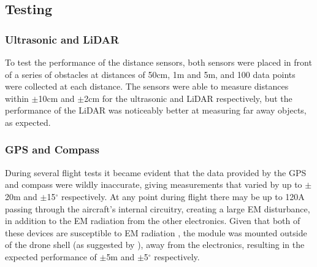 \subsection{Testing}
\subsubsection*{Ultrasonic and LiDAR}
To test the performance of the distance sensors, both sensors were placed in front of a series of obstacles at distances of 50cm, 1m and 5m, and 100 data points were collected at each distance. The sensors were able to measure distances within $\pm$10cm and $\pm$2cm for the ultrasonic and LiDAR respectively, but the performance of the LiDAR was noticeably better at measuring far away objects, as expected.  
	
\subsubsection*{GPS and Compass}  
During several flight tests it became evident that the data provided by the GPS and compass were wildly inaccurate, giving measurements that varied by up to $\pm$20m and $\pm$15$^\circ$ respectively. At any point during flight there may be up to 120A passing through the aircraft's internal circuitry, creating a large EM disturbance, in addition to the EM radiation from the other electronics. Given that both of these devices are susceptible to EM radiation \cite{ref:gpsinterference}, the module was mounted outside of the drone shell (as suggested by \cite{ref:gpsposition}), away from the electronics, resulting in the expected performance of $\pm$5m and $\pm$5$^\circ$ respectively.